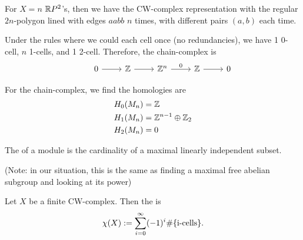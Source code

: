 \documentclass[11pt,leqno,oneside]{amsart}
\numberwithin{thm}{section}
\newcommand{\homl}[1][n]{H_{#1}}
\begin{document}
For $X = n$ ${\mathbb R} P^2$'s, then we have the CW-complex representation with the regular $2n$-polygon lined with edges $aabb$ $n$ times, with different pairs $(a,b)$ each time.

Under the rules where we could each cell once (no redundancies), we have 1 0-cell, $n$ 1-cells, and 1 2-cell.  Therefore, the chain-complex is
$$\begin{tikzcd}
  &0 \arrow[r, ""] &\Z \arrow[r, ""] &\Z^{n} \arrow[r, "0"] &\Z \arrow[r, ""] &0
\end{tikzcd}$$

For the chain-complex, we find the homologies are
\begin{align}
  \homl[0](M_n) &= \Z \\
  \homl[1](M_n) &= \Z^{n - 1} \dsum \Z_2 \\
  \homl[2](M_n) &= 0
\end{align}

\begin{defn}
  The \de{$\rank$} of a module is the cardinality of a maximal linearly independent subset.
\end{defn}
(Note: in our situation, this is the same as finding a maximal free abelian subgroup and looking at its power)

\begin{defn}
  Let $X$ be a finite CW-complex.  Then the  is
  $$\chi(X) := \sum_{i=0}^\infty (-1)^i \#\{\text{i-cells}\}. $$
\end{defn}
\end{document}
